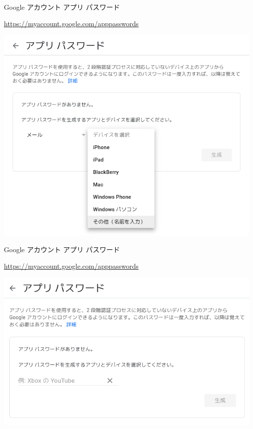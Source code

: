 \begin{frame}{Google アカウント アプリ パスワード}

{\footnotesize\url{https://myaccount.google.com/apppasswords}}

\begin{center}
\includegraphics[width=0.8\hsize]{image202205/g-apppass-0-1.png}
\end{center}

\begin{quote}
\end{quote}

\end{frame}

\begin{frame}{Google アカウント アプリ パスワード}

{\footnotesize\url{https://myaccount.google.com/apppasswords}}

\begin{center}
\includegraphics[width=0.8\hsize]{image202205/g-apppass-0-2.png}
\end{center}

\begin{quote}
\end{quote}

\end{frame}

